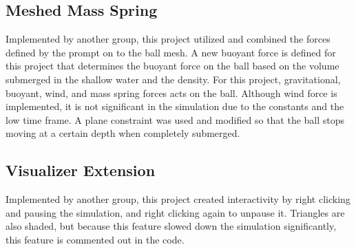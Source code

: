 \documentclass[12pt,letterpaper]{article}
\begin{document}
\newpage


\subsection*{Meshed Mass Spring}
Implemented by another group, this project utilized and combined the forces defined by the prompt on to the ball mesh. A new buoyant force is defined for this project that determines the buoyant force on the ball based on the volume submerged in the shallow water and the density. For this project, gravitational, buoyant, wind, and mass spring forces acts on the ball. Although wind force is implemented, it is not significant in the simulation due to the constants and the low time frame. A plane constraint was used and modified so that the ball stops moving at a certain depth when completely submerged. 


\subsection*{Visualizer Extension}
Implemented by another group, this project created interactivity by right clicking and pausing the simulation, and right clicking again to unpause it. Triangles are also shaded, but because this feature slowed down the simulation significantly, this feature is commented out in the code. 
\end{document}
